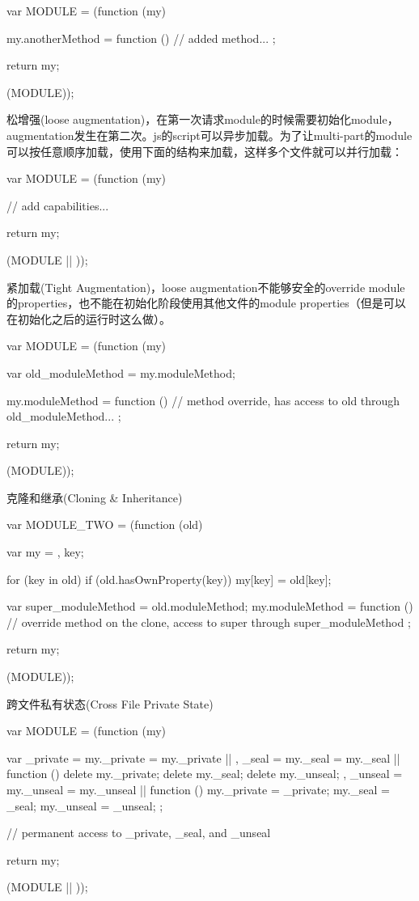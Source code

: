 \begin{JavaScript}
var MODULE = (function (my) {
	my.anotherMethod = function () {
		// added method...
	};

	return my;
}(MODULE));
\end{JavaScript}

松增强(loose augmentation)，在第一次请求module的时候需要初始化module，augmentation发生在第二次。js的script可以异步加载。为了让multi-part的module可以按任意顺序加载，使用下面的结构来加载，这样多个文件就可以并行加载：

\begin{JavaScript}
var MODULE = (function (my) {
	// add capabilities...

	return my;
}(MODULE || {}));
\end{JavaScript}


紧加载(Tight Augmentation)，loose augmentation不能够安全的override module的properties，也不能在初始化阶段使用其他文件的module properties（但是可以在初始化之后的运行时这么做）。

\begin{JavaScript}[保留一个原始方法的引用的方式来override方法]
var MODULE = (function (my) {
	var old_moduleMethod = my.moduleMethod;

	my.moduleMethod = function () {
		// method override, has access to old through old_moduleMethod...
	};

	return my;
}(MODULE));
\end{JavaScript}
克隆和继承(Cloning \& Inheritance)

\begin{JavaScript}
var MODULE_TWO = (function (old) {
	var my = {},
		key;

	for (key in old) {
		if (old.hasOwnProperty(key)) {
			my[key] = old[key];
		}
	}

	var super_moduleMethod = old.moduleMethod;
	my.moduleMethod = function () {
		// override method on the clone, access to super through super_moduleMethod
	};

	return my;
}(MODULE));
\end{JavaScript}


跨文件私有状态(Cross File Private State)

\begin{JavaScript}
var MODULE = (function (my) {
	var _private = my._private = my._private || {},
		_seal = my._seal = my._seal || function () {
			delete my._private;
			delete my._seal;
			delete my._unseal;
		},
		_unseal = my._unseal = my._unseal || function () {
			my._private = _private;
			my._seal = _seal;
			my._unseal = _unseal;
		};

	// permanent access to _private, _seal, and _unseal

	return my;
}(MODULE || {}));
\end{JavaScript}


